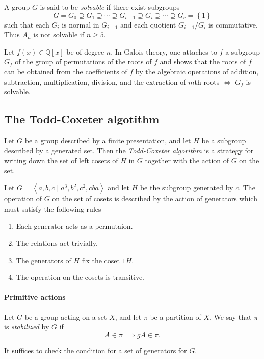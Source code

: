 \begin{remark}
  A group \( G \) is said to be \emph{solvable} if there exist subgroups
  \[
    G = G_0 \supseteq G_1 \supseteq \cdots \supseteq G_{i - 1} \supseteq G_i \supseteq \cdots \supseteq G_r = \left\lbrace 1 \right\rbrace
  \]
  such that each \( G_i \) is normal in \( G_{i - 1} \) and each quotient \( G_{i - 1} / G_i \) is commutative.
  Thus \( A_n \) is not solvable if \( n \geq 5 \).

  Let \( f(x) \in \mathbb{Q}[x] \) be of degree \( n \).
  In Galois theory, one attaches to \( f \) a subgroup \( G_f \) of the group of permutations of the roots of \( f \) and shows that the roots of \( f \) can be obtained from the coefficients of \( f \) by the algebraic operations of addition, subtraction, multiplication, division, and the extraction of \( m \)th roots \( \iff \) \( G_f \) is solvable.
\end{remark}

\subsection{The Todd-Coxeter algotithm}

Let \( G \) be a group described by a finite presentation, and let \( H \) be a subgroup described by a generated set.
Then the \emph{Todd-Coxeter algorithm } is a strategy for writing down the set of left cosets of \( H \) in \( G \) together with the action of \( G \) on the set.

Let \( G = \left\langle a, b, c \mid a^3, b^2, c^2, cba \right\rangle \) and let \( H \) be the subgroup generated by \( c \).
The operation of \( G \) on the set of cosets is described by the action of generators which must satisfy the following rules
\begin{enumerate}
  \item Each generator acts as a permutaion.
  \item The relations act trivially.
  \item The generators of \( H \) fix the coset \( 1H \).
  \item The operation on the cosets is transitive.
\end{enumerate}

\paragraph{Primitive actions}

\begin{definition}
  Let \( G \) be a group acting on a set \( X \), and let \( \pi \) be a partition of \( X \).
  We say that \( \pi \) is \emph{stabilized} by \( G \) if
  \[
    A \in \pi \implies gA \in \pi.
  \]
\end{definition}
\begin{remark}
  It suffices to check the condition for a set of generators for \( G \).
\end{remark}


